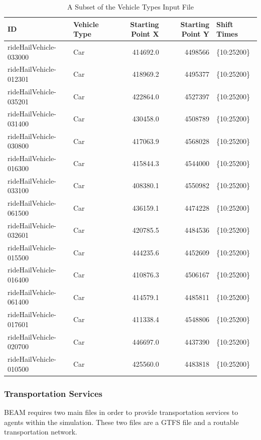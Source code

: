\documentclass[12pt, oneside, openright]{byuthesis}
\begin{document}
\begin{table}

\caption{\label{tab:rhveh}A Subset of the Vehicle Types Input File}
\centering
\begin{tabular}[t]{llrrl}
\toprule
ID & Vehicle Type & Starting Point X & Starting Point Y & Shift Times\\
\midrule
rideHailVehicle-033000 & Car & 414692.0 & 4498566 & \{10:25200\}\\
rideHailVehicle-012301 & Car & 418969.2 & 4495377 & \{10:25200\}\\
rideHailVehicle-035201 & Car & 422864.0 & 4527397 & \{10:25200\}\\
rideHailVehicle-031400 & Car & 430458.0 & 4508789 & \{10:25200\}\\
rideHailVehicle-030800 & Car & 417063.9 & 4568028 & \{10:25200\}\\
\addlinespace
rideHailVehicle-016300 & Car & 415844.3 & 4544000 & \{10:25200\}\\
rideHailVehicle-033100 & Car & 408380.1 & 4550982 & \{10:25200\}\\
rideHailVehicle-061500 & Car & 436159.1 & 4474228 & \{10:25200\}\\
rideHailVehicle-032601 & Car & 420785.5 & 4484536 & \{10:25200\}\\
rideHailVehicle-015500 & Car & 444235.6 & 4452609 & \{10:25200\}\\
\addlinespace
rideHailVehicle-016400 & Car & 410876.3 & 4506167 & \{10:25200\}\\
rideHailVehicle-061400 & Car & 414579.1 & 4485811 & \{10:25200\}\\
rideHailVehicle-017601 & Car & 411338.4 & 4548806 & \{10:25200\}\\
rideHailVehicle-020700 & Car & 446697.0 & 4437390 & \{10:25200\}\\
rideHailVehicle-010500 & Car & 425560.0 & 4483818 & \{10:25200\}\\
\bottomrule
\end{tabular}
\end{table}

\hypertarget{transportation-services}{%
\subsubsection{Transportation Services}\label{transportation-services}}

BEAM requires two main files in order to provide transportation services to agents within the simulation. These two files are a GTFS file and a routable transportation network.
\end{document}
